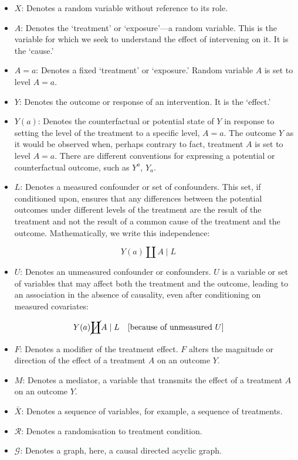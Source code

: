 \documentclass[
  single column]{article}
\providecommand{\tightlist}{%
  \setlength{\itemsep}{0pt}\setlength{\parskip}{0pt}}\usepackage{longtable,booktabs,array}
\begin{document}
\begin{itemize}
\item
  \textbf{\(X\)}: Denotes a random variable without reference to its
  role.
\item
  \textbf{\(A\)}: Denotes the `treatment' or `exposure'---a random
  variable. This is the variable for which we seek to understand the
  effect of intervening on it. It is the `cause.'
\item
  \textbf{\(A=a\)}: Denotes a fixed `treatment' or `exposure.' Random
  variable \(A\) is set to level \(A=a\).
\item
  \textbf{\(Y\)}: Denotes the outcome or response of an intervention. It
  is the `effect.'
\item
  \textbf{\(Y(a)\)}: Denotes the counterfactual or potential state of
  \(Y\) in response to setting the level of the treatment to a specific
  level, \(A=a\). The outcome \(Y\) as it would be observed when,
  perhaps contrary to fact, treatment \(A\) is set to level \(A=a\).
  There are different conventions for expressing a potential or
  counterfactual outcome, such as \(Y^a\), \(Y_a\).
\item
  \textbf{\(L\)}: Denotes a measured confounder or set of confounders.
  This set, if conditioned upon, ensures that any differences between
  the potential outcomes under different levels of the treatment are the
  result of the treatment and not the result of a common cause of the
  treatment and the outcome. Mathematically, we write this independence:
\end{itemize}

\[
Y(a) \coprod A \mid L
\]

\begin{itemize}
\tightlist
\item
  \textbf{\(U\)}: Denotes an unmeasured confounder or confounders. \(U\)
  is a variable or set of variables that may affect both the treatment
  and the outcome, leading to an association in the absence of
  causality, even after conditioning on measured covariates:
\end{itemize}

\[
Y(a) \cancel{\coprod} A \mid L \quad \text{[because of unmeasured } U]
\]

\begin{itemize}
\item
  \textbf{\(F\)}: Denotes a modifier of the treatment effect. \(F\)
  alters the magnitude or direction of the effect of a treatment \(A\)
  on an outcome \(Y\).
\item
  \textbf{\(M\)}: Denotes a mediator, a variable that transmits the
  effect of a treatment \(A\) on an outcome \(Y\).
\item
  \textbf{\(\bar{X}\)}: Denotes a sequence of variables, for example, a
  sequence of treatments.
\item
  \textbf{\(\mathcal{R}\)}: Denotes a randomisation to treatment
  condition.
\item
  \textbf{\(\mathcal{G}\)}: Denotes a graph, here, a causal directed
  acyclic graph.
\end{itemize}
\end{document}
